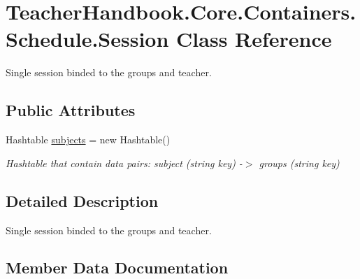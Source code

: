 \hypertarget{class_teacher_handbook_1_1_core_1_1_containers_1_1_schedule_1_1_session}{}\section{Teacher\+Handbook.\+Core.\+Containers.\+Schedule.\+Session Class Reference}
\label{class_teacher_handbook_1_1_core_1_1_containers_1_1_schedule_1_1_session}


Single session binded to the groups and teacher.  


\subsection*{Public Attributes}
\begin{DoxyCompactItemize}
\item 
Hashtable \mbox{\hyperlink{class_teacher_handbook_1_1_core_1_1_containers_1_1_schedule_1_1_session_a1e3ab318ef7a0b8330eb06704d129531}{subjects}} = new Hashtable()
\begin{DoxyCompactList}\small\item\em Hashtable that contain data pairs\+: subject (string key) -\/$>$ groups (string key) \end{DoxyCompactList}\end{DoxyCompactItemize}


\subsection{Detailed Description}
Single session binded to the groups and teacher. 



\subsection{Member Data Documentation}
\mbox{\label{class_teacher_handbook_1_1_core_1_1_containers_1_1_schedule_1_1_session_a1e3ab318ef7a0b8330eb06704d129531}} 
